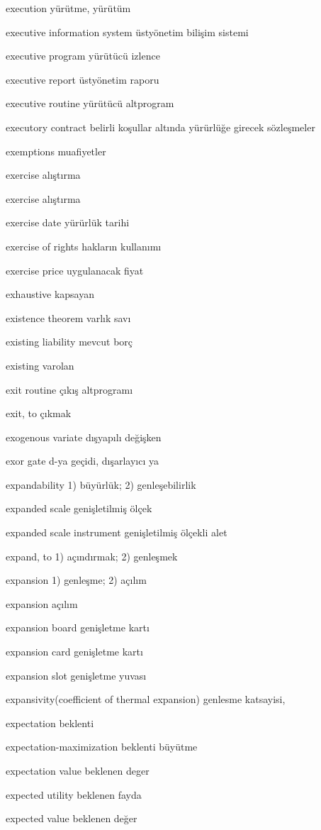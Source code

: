 \documentclass[12pt,fleqn]{article}\usepackage{../../common}
\begin{document}
execution yürütme, yürütüm

executive information system üstyönetim bilişim sistemi

executive program yürütücü izlence

executive report üstyönetim raporu

executive routine yürütücü altprogram

executory contract belirli koşullar altında yürürlüğe girecek sözleşmeler

exemptions muafiyetler

exercise alıştırma

exercise alıştırma

exercise date yürürlük tarihi

exercise of rights hakların kullanımı

exercise price uygulanacak fiyat

exhaustive kapsayan

existence theorem varlık savı

existing liability mevcut borç

existing varolan

exit routine çıkış altprogramı

exit, to çıkmak

exogenous variate dışyapılı değişken

exor gate d-ya geçidi, dışarlayıcı ya

expandability 1) büyürlük; 2) genleşebilirlik

expanded scale genişletilmiş ölçek

expanded scale instrument genişletilmiş ölçekli alet

expand, to 1) açındırmak; 2) genleşmek

expansion 1) genleşme; 2) açılım

expansion açılım

expansion board genişletme kartı

expansion card genişletme kartı

expansion slot genişletme yuvası

expansivity(coefficient of thermal expansion) genlesme katsayisi,

expectation beklenti

expectation-maximization beklenti büyütme

expectation value beklenen deger

expected utility beklenen fayda

expected value beklenen değer
\end{document}

